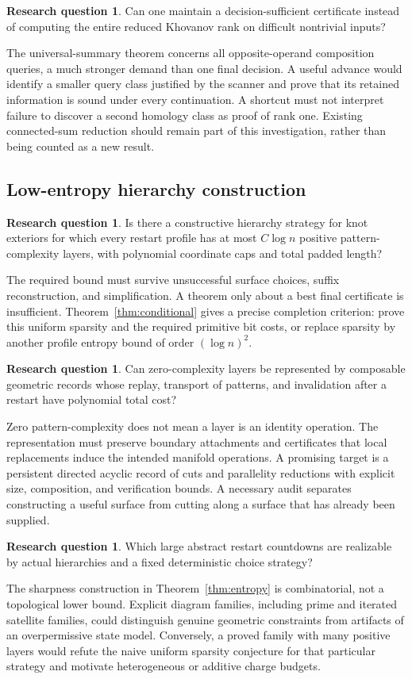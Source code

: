 \documentclass[11pt,letterpaper]{article}
\theoremstyle{definition}
\newtheorem{question}[theorem]{Research question}
\theoremstyle{remark}
\begin{document}
\begin{question}
Can one maintain a decision-sufficient certificate instead of computing the
entire reduced Khovanov rank on difficult nontrivial inputs?
\end{question}
The universal-summary theorem concerns all opposite-operand composition
queries, a much stronger demand than one final decision. A useful advance
would identify a smaller query class justified by the scanner and prove
that its retained information is sound under every continuation. A
shortcut must not interpret failure to discover a second homology class as
proof of rank one. Existing connected-sum reduction should remain part of
this investigation, rather than being counted as a new result.

\subsection{Low-entropy hierarchy construction}
\begin{question}
Is there a constructive hierarchy strategy for knot exteriors for which
every restart profile has at most $C\log n$ positive pattern-complexity
layers, with polynomial coordinate caps and total padded length?
\end{question}
The required bound must survive unsuccessful surface choices, suffix
reconstruction, and simplification. A theorem only about a best final
certificate is insufficient. Theorem~\ref{thm:conditional} gives a precise
completion criterion: prove this uniform sparsity and the required
primitive bit costs, or replace sparsity by another profile entropy bound
of order $(\log n)^2$.

\begin{question}
Can zero-complexity layers be represented by composable geometric records
whose replay, transport of patterns, and invalidation after a restart have
polynomial total cost?
\end{question}
Zero pattern-complexity does not mean a layer is an identity operation.
The representation must preserve boundary attachments and certificates
that local replacements induce the intended manifold operations. A
promising target is a persistent directed acyclic record of cuts and
parallelity reductions with explicit size, composition, and verification
bounds. A necessary audit separates constructing a useful surface from
cutting along a surface that has already been supplied.

\begin{question}
Which large abstract restart countdowns are realizable by actual
hierarchies and a fixed deterministic choice strategy?
\end{question}
The sharpness construction in Theorem~\ref{thm:entropy} is combinatorial,
not a topological lower bound. Explicit diagram families, including prime
and iterated satellite families, could distinguish genuine geometric
constraints from artifacts of an overpermissive state model. Conversely,
a proved family with many positive layers would refute the naive uniform
sparsity conjecture for that particular strategy and motivate heterogeneous
or additive charge budgets.
\end{document}
